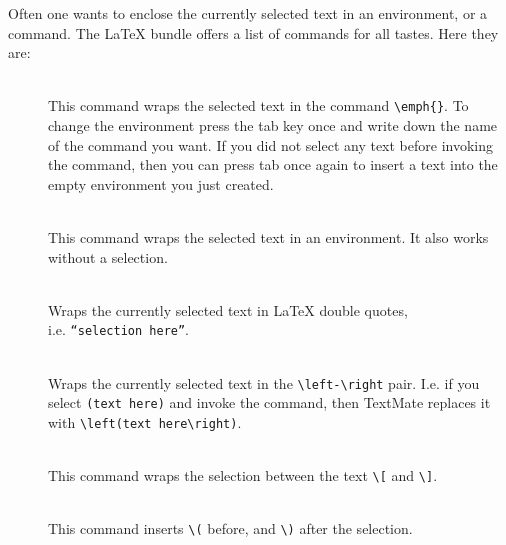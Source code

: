 \documentclass[11pt, x11names]{article}
\begin{document}
Often one wants to enclose the currently selected text in an environment, or a command. The LaTeX bundle offers a list of  commands for all tastes. Here they are:

\begin{description}

  \item[]~\hfill~\\

  This command wraps the selected text in the command \texttt{\textbackslash{}emph\{\}}. To change the environment press the tab key once and write down the name of the command you want. If you did not select any text before invoking the command, then you can press tab once again to insert a text into the empty environment you just created.

  \item[]~\hfill~\\

  This command wraps the selected text in an environment. It also works without a selection.

  \item[]~\hfill~\\

  Wraps the currently selected text in LaTeX double quotes,\\
  i.e. \texttt{``selection here''}.

  \item[]~\hfill~\\

  Wraps the currently selected text in the \texttt{\textbackslash{}left-\textbackslash{}right} pair. I.e. if you select \texttt{(text\ here)} and invoke the command, then TextMate replaces it with \texttt{\textbackslash{}left(text\ here\textbackslash{}right)}.

  \item[]~\hfill~\\

  This command wraps the selection between the text \texttt{\textbackslash{}{[}} and \texttt{\textbackslash{}{]}}.

  \item[]~\hfill~\\

  This command inserts \texttt{\textbackslash{}(} before, and \texttt{\textbackslash{})} after the selection.

\end{description}
\end{document}
